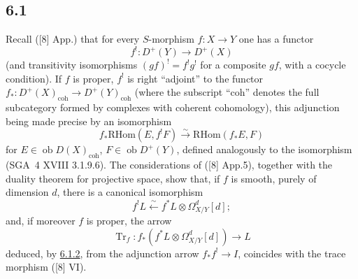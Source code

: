 \documentclass[11pt]{article}
\providecommand{\RHom}{\mathrm{RHom}}
\providecommand{\RHom}{\mathrm{RHom}}
\providecommand{\RHom}{\mathrm R\mathcal{H}om}
\providecommand{\RHom}{\mathrm{RHom}}
\begin{document}
\subsection*{6.1}\label{sga5:III:subsection:6.1}
Recall ([8] App.) that for every $S$-morphism $f:X\to Y$ one has a functor
\[
f^!:D^+(Y)\longrightarrow D^+(X)
\]
(and transitivity isomorphisms $(gf)^! = f^!g^!$ for a composite $gf$, with a cocycle condition). If $f$ is proper, $f^!$ is right ``adjoint'' to the functor $f_*:D^+(X)_{\mathrm{coh}}\to D^+(Y)_{\mathrm{coh}}$ (where the subscript ``coh'' denotes the full subcategory formed by complexes with coherent cohomology), this adjunction being made precise by an isomorphism
\begin{equation}
\tag{6.1.1}\label{sga5:III:equation:6.1.1}
f_*\RHom(E,f^!F)\xrightarrow{\sim}\RHom(f_*E,F)
\end{equation}
for $E\in\operatorname{ob}D(X)_{\mathrm{coh}}$, $F\in\operatorname{ob}D^+(Y)$, defined analogously to the isomorphism (SGA~4 XVIII 3.1.9.6). The considerations of ([8] App.5), together with the duality theorem for projective space, show that, if $f$ is smooth, purely of dimension $d$, there is a canonical isomorphism
\begin{equation}
\tag{6.1.2}\label{sga5:III:equation:6.1.2}
f^!L\xleftarrow{\sim} f^*L\otimes\Omega^d_{X/Y}[d];
\end{equation}
and, if moreover $f$ is proper, the arrow
\begin{equation}
\tag{6.1.3}\label{sga5:III:equation:6.1.3}
\operatorname{Tr}_f:f_*(f^*L\otimes\Omega^d_{X/Y}[d])\longrightarrow L
\end{equation}
deduced, by \hyperref[sga5:III:equation:6.1.2]{6.1.2}, from the adjunction arrow $f_*f^!\to I$, coincides with the trace morphism ([8] VI).
\end{document}
